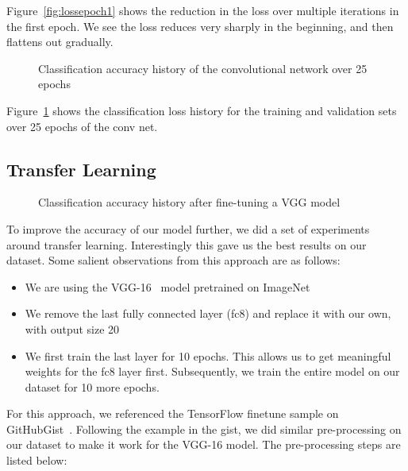 Figure~\ref{fig:lossepoch1} shows the reduction in the loss over multiple iterations in the first epoch. We see the loss reduces very sharply in the beginning, and then flattens out gradually.  

\begin{figure}[h!]
\centering
  \caption{Classification accuracy history of the convolutional network over 25 epochs}
  \label{fig:convnetclassificationaccuracy}
\end{figure}

Figure~\ref{fig:convnetclassificationaccuracy} shows the classification loss history for the training and validation sets over 25 epochs of the conv net.

\subsection{Transfer Learning}
\label{subsec:transferlearning}

\begin{figure}[h!]
\centering
  \caption{Classification accuracy history after fine-tuning a VGG model}
  \label{fig:transferlearning}
\end{figure}

To improve the accuracy of our model further, we did a set of experiments around transfer learning. Interestingly this gave us the best results on our dataset.  Some salient observations from this approach are as follows:

\begin{itemize}[noitemsep]
\item We are using the VGG-16~\cite{simonyan2014very} model pretrained on ImageNet
\item We remove the last fully connected layer (fc8) and replace it with our own, with output size 20
\item We first train the last layer for 10 epochs. This allows us to get meaningful weights for the fc8 layer first.  Subsequently, we train the entire model on our dataset for 10 more epochs.
\end{itemize}

For this approach, we referenced the TensorFlow finetune sample on GitHubGist~\cite{finetunegithubgist}. Following the example in the gist, we did similar pre-processing on our dataset to make it work for the VGG-16 model. The pre-processing steps are listed below:

